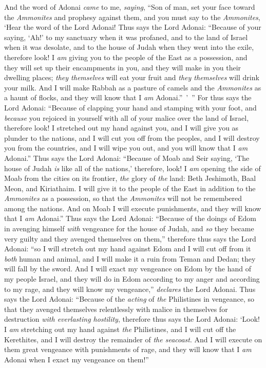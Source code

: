 \begin{biblechapter} %
 And the word of Adonai \textit{came} to me, \textit{saying},
\verse “Son of man, set your face toward the \textit{Ammonites} and prophesy against them,
\verse and you must say to the \textit{Ammonites}, ‘Hear the word of the Lord Adonai! Thus says the Lord Adonai: “Because of your saying, ‘Ah!’ to my sanctuary when it was profaned, and to the land of Israel when it was desolate, and to the house of Judah when they went into the exile,
\verse therefore look! I \textit{am} giving you to the people of the East as a possession, and they will set up their encampments in you, and they will make in you their dwelling places; \textit{they themselves} will eat your fruit and \textit{they themselves} will drink your milk.
\verse And I will make Rabbah as a pasture of camels and the \textit{Ammonites} as a haunt of flocks, and they will know that I \textit{am} Adonai.” ’ ”
\verse For thus says the Lord Adonai: “Because of clapping your hand and stamping with your foot, and \textit{because} you rejoiced in yourself with all of your malice over the land of Israel,
\verse therefore look! I stretched out my hand against you, and I will give you as plunder to the nations, and I will cut you off from the peoples, and I will destroy you from the countries, and I will wipe you out, and you will know that I \textit{am} Adonai.”
\verse Thus says the Lord Adonai: “Because of Moab and Seir saying, ‘The house of Judah \textit{is} like all of the nations,’
\verse therefore, look! I \textit{am} opening the side of Moab from the cities on its frontier, \textit{the} glory of \textit{the} land: Beth Jeshimoth, Baal Meon, and Kiriathaim.
\verse I will give it to the people of the East in addition to the \textit{Ammonites} as a possession, so that the \textit{Ammonites} will not be remembered among the nations.
\verse And on Moab I will execute punishments, and they will know that I \textit{am} Adonai.”
\verse Thus says the Lord Adonai: “Because of the doings of Edom in avenging himself \textit{with} vengeance for the house of Judah, and \textit{so} they became very guilty and they avenged themselves on them,”
\verse therefore thus says the Lord Adonai: “so I will stretch out my hand against Edom and I will cut off from it \textit{both} human and animal, and I will make it a ruin from Teman and Dedan; they will fall by the sword.
\verse And I will exact my vengeance on Edom by the hand of my people Israel, and they will do in Edom according to my anger and according to my rage, and they will know my vengeance,” \textit{declares} the Lord Adonai.
\verse Thus says the Lord Adonai: “Because of the \textit{acting} of \textit{the} Philistines in vengeance, so that they avenged themselves relentlessly with malice in themselves for destruction \textit{with everlasting hostility},
\verse therefore thus says the Lord Adonai: ‘Look! I \textit{am} stretching out my hand against \textit{the} Philistines, and I will cut off the Kerethites, and I will destroy the remainder of \textit{the seacoast}.
\verse And I will execute on them great vengeance with punishments of rage, and they will know that I \textit{am} Adonai when I exact my vengeance on them!”
\end{biblechapter}

